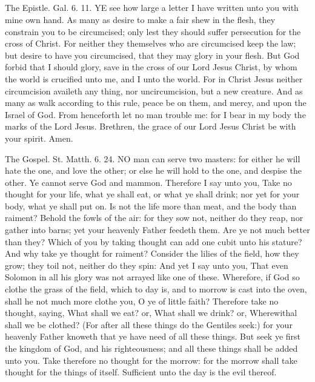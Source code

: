 \subsection{}


The Epistle. Gal. 6. 11.
YE see how large a letter I have written unto you with mine own hand. As many as desire to make a fair shew in the flesh, they constrain you to be circumcised; only lest they should suffer persecution for the cross of Christ. For neither they themselves who are circumcised keep the law; but desire to have you circumcised, that they may glory in your flesh. But God forbid that I should glory, save in the cross of our Lord Jesus Christ, by whom the world is crucified unto me, and I unto the world. For in Christ Jesus neither circumcision availeth any thing, nor uncircumcision, but a new creature. And as many as walk according to this rule, peace be on them, and mercy, and upon the Israel of God. From henceforth let no man trouble me: for I bear in my body the marks of the Lord Jesus. Brethren, the grace of our Lord Jesus Christ be with your spirit. Amen.


The Gospel. St. Matth. 6. 24.
NO man can serve two masters: for either he will hate the one, and love the other; or else he will hold to the one, and despise the other. Ye cannot serve God and mammon. Therefore I say unto you, Take no thought for your life, what ye shall eat, or what ye shall drink; nor yet for your body, what ye shall put on. Is not the life more than meat, and the body than raiment? Behold the fowls of the air: for they sow not, neither do they reap, nor gather into barns; yet your heavenly Father feedeth them. Are ye not much better than they? Which of you by taking thought can add one cubit unto his stature? And why take ye thought for raiment? Consider the lilies of the field, how they grow; they toil not, neither do they spin: And yet I say unto you, That even Solomon in all his glory was not arrayed like one of these. Wherefore, if God so clothe the grass of the field, which to day is, and to morrow is cast into the oven, shall he not much more clothe you, O ye of little faith? Therefore take no thought, saying, What shall we eat? or, What shall we drink? or, Wherewithal shall we be clothed? (For after all these things do the Gentiles seek:) for your heavenly Father knoweth that ye have need of all these things. But seek ye first the kingdom of God, and his righteousness; and all these things shall be added unto you. Take therefore no thought for the morrow: for the morrow shall take thought for the things of itself. Sufficient unto the day is the evil thereof.


